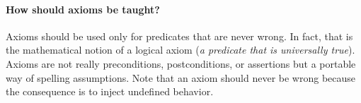 \paragraph{How should axioms be taught?}
Axioms should be used only for predicates that are never wrong.
In fact, that is the mathematical notion of a logical axiom 
(\emph{a predicate that is universally true}).
Axioms are not really preconditions, postconditions, or assertions but
a portable way of spelling assumptions.
Note that an axiom should never be wrong because the consequence is
to inject undefined behavior.
